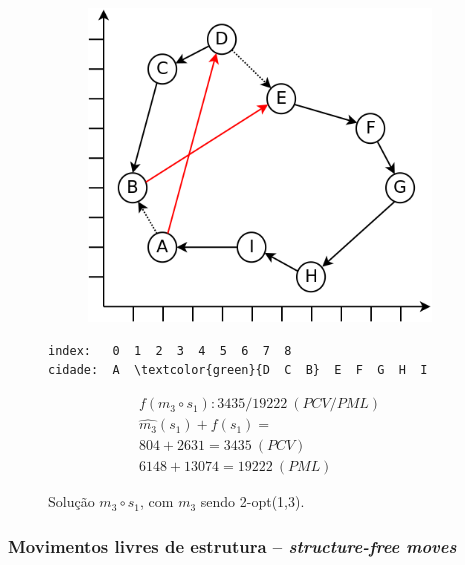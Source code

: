 \begin{figure}[ht]
    \begin{minipage}{.475\textwidth}
        \begin{subfigure}[t]{1\textwidth} %
            \includegraphics[width=1\linewidth]{figuras/pml/exemplo-rodolfo-2opt-1-3.png}
        \end{subfigure}
    \end{minipage}
    \begin{minipage}{.475\textwidth}
\begin{Verbatim}[commandchars=\\\{\}]
index:   0  1  2  3  4  5  6  7  8
cidade:  A  \textcolor{green}{D  C  B}  E  F  G  H  I
\end{Verbatim}
\begin{gather*}
f(m_3 \circ s_1): 3435/19222 \ (PCV/PML) \\
\widehat{m_3}(s_1)+f(s_1) = \\
804 + 2631 = 3435 \ (PCV)\\
6148 + 13074 = 19222 \ (PML)
\end{gather*}
    \end{minipage}
    \caption{Solução $m_3 \circ s_1$, com $m_3$ sendo 2-opt(1,3).}
    \label{fig:figuraExemplo_m3s1}
\end{figure}

\subsubsection{Movimentos livres de estrutura -- \emph{structure-free moves}} \label{subsubsec:movimentosLivresDeContexto}

